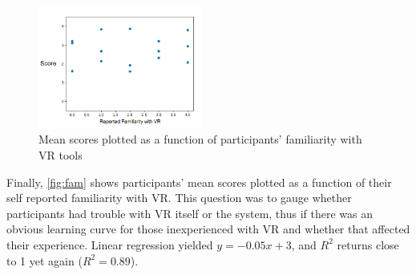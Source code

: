 \begin{figure}
	\centering
	\includegraphics[width = 0.48\textwidth]{Familiarity.png}
	\caption{Mean scores plotted as a function of participants' familiarity with VR tools}
	\label{fig:fam}
\end{figure}

Finally, \autoref{fig:fam} shows participants' mean scores plotted as a function of their self reported familiarity with VR. This question was to gauge whether participants had trouble with VR itself or the system, thus if there was an obvious learning curve for those inexperienced with VR and whether that affected their experience. Linear regression yielded $y = -0.05x + 3$, and $R^2$ returns close to 1 yet again ($R^2=0.89$).